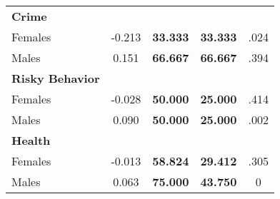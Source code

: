 \begin{tabular}{l c c c c}
\midrule
\textbf{Crime} & & & & \\
\quad Females &     -0.213 & \textbf{   33.333} & \textbf{   33.333} & .024 \\
\quad Males &      0.151 & \textbf{   66.667} & \textbf{   66.667} & .394 \\
\midrule
\textbf{Risky Behavior} & & & & \\
\quad Females &     -0.028 & \textbf{   50.000} & \textbf{   25.000} & .414 \\
\quad Males &      0.090 & \textbf{   50.000} & \textbf{   25.000} & .002 \\
\midrule
\textbf{Health} & & & & \\
\quad Females &     -0.013 & \textbf{   58.824} & \textbf{   29.412} & .305 \\
\quad Males &      0.063 & \textbf{   75.000} & \textbf{   43.750} & 0 \\
\bottomrule
\end{tabular}
